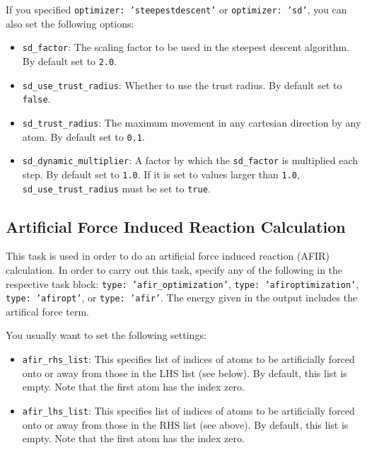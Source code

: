 \documentclass[]{tufte-book}
\begin{document}
If you specified \texttt{optimizer: 'steepestdescent'} or \texttt{optimizer: 'sd'}, you can also set the following options:
\begin{itemize}
\item \texttt{sd\_factor}: The scaling factor to be used in the steepest descent algorithm. By default set to \texttt{2.0}.
\item \texttt{sd\_use\_trust\_radius}: Whether to use the trust radius. By default set to \texttt{false}.
\item \texttt{sd\_trust\_radius}: The maximum movement in any cartesian direction by any atom. By default set to \texttt{0.1}.
\item \texttt{sd\_dynamic\_multiplier}: A factor by which the \texttt{sd\_factor} is multiplied each step. By default set to \texttt{1.0}.
If it is set to values larger than \texttt{1.0}, \texttt{sd\_use\_trust\_radius} must be set to \texttt{true}.
\end{itemize}

\subsection{Artificial Force Induced Reaction Calculation}

This task is used in order to do an artificial force induced reaction (AFIR\cite{afir1, afir2}) calculation. In
order to carry out this task, specify any of the following in the respective task block: \texttt{type: 'afir\_optimization'},
\texttt{type: 'afiroptimization'}, \texttt{type: 'afiropt'}, or \texttt{type: 'afir'}. The energy given in the output
includes the artifical force term.

You usually want to set the following settings:
\begin{itemize}
\item \texttt{afir\_rhs\_list}: This specifies list of indices of atoms to be artificially forced onto or away from those
in the LHS list (see below). By default, this list is empty. Note that the first atom has the index zero.
\item \texttt{afir\_lhs\_list}: This specifies list of indices of atoms to be artificially forced onto or away from those
in the RHS list (see above). By default, this list is empty. Note that the first atom has the index zero.
\end{itemize}
\end{document}
